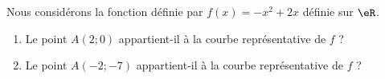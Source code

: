 
\begin{exercice}\label{exoSeconde-0043}

  Nous considérons la fonction définie par $f(x)=-x^2+2x$ définie sur \( \eR\).
  \begin{enumerate}
      \item
        Le point $A(2;0)$ appartient-il à la courbe représentative de \( f\)  ?
        
  \item
        Le point $A(-2;-7)$ appartient-il à la courbe représentative de \( f\)  ?
  \end{enumerate}

\end{exercice}
